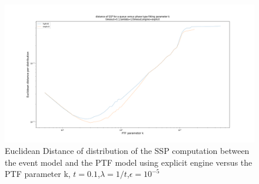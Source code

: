 \documentclass[paper=a4, fontsize=11pt]{scrartcl}
\numberwithin{equation}{section}		%
\numberwithin{figure}{section}			%
\numberwithin{table}{section}				%
\begin{document}
	
	\begin{figure}
		\centering
		\includegraphics[width=18cm]{picture/eucl_distance.png}
		\caption{Euclidean Distance of distribution of the SSP computation between the event model and the PTF model using explicit engine versus the PTF parameter k,	$t=0.1$,$\lambda=1/t$,$\epsilon=10^{-5}$}
		\label{fig:dist02_explicit_001}
	\end{figure}


\end{document}
